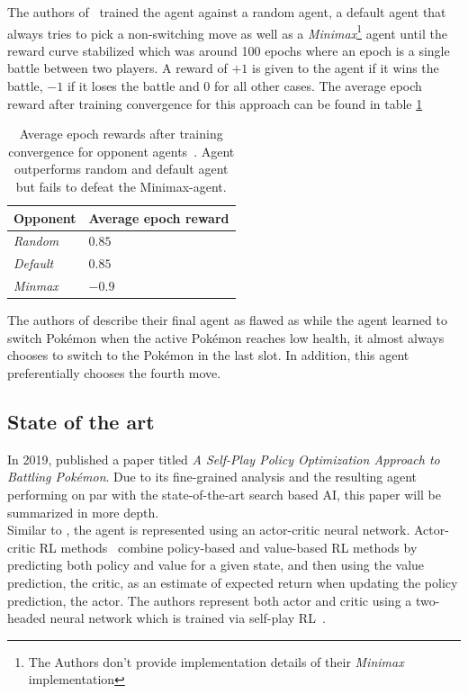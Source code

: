The authors of~\cite{GottaTrainEmAll} trained the agent against a random agent, a default agent 
that always tries to pick a non-switching move as well as a \emph{Minimax}\footnote{The Authors don't
provide implementation details of their \emph{Minimax} implementation} agent
until the reward curve stabilized which was around 100 epochs where an epoch is a single battle between
two players. A reward of $+1$ is given to the agent if it wins the battle, $-1$ if it loses the battle and
$0$ for all other cases. The average epoch reward after training convergence for this approach can
be found in table \ref{tbl:Gotta-Performance}
\begin{table}[h]
    \centering
        \begin{tabular}{|l|l|}
            \hline
            Opponent & Average epoch reward \\
            \hline
            \emph{Random} & $0.85$ \\
            \hline
            \emph{Default} & $0.85$ \\
            \hline
            \emph{Minmax} & $-0.9$ \\
            \hline
        \end{tabular}
        \caption{Average epoch rewards after training convergence for opponent agents~\autocite{GottaTrainEmAll}. Agent
        outperforms random and default agent but fails to defeat the Minimax-agent.}
        \label{tbl:Gotta-Performance}
\end{table}
The authors of \cite{GottaTrainEmAll} describe their final agent as flawed as while the agent learned 
to switch Pokémon when the active Pokémon reaches low health, it almost always chooses to switch to the
Pokémon in the last slot. In addition, this agent preferentially chooses the fourth move. 

\subsection{State of the art}
In 2019, \cite{Huang_Lee_2019} published a paper titled \emph{A Self-Play Policy 
Optimization Approach to Battling Pokémon}. 
Due to its fine-grained analysis and the resulting agent performing on par with the state-of-the-art search
based AI, this paper will be summarized in more depth. \\
Similar to \cite{OpenAI_dota}, the agent is represented using an actor-critic neural network.
Actor-critic RL methods~\autocite{Konda_Tsitsiklis}
combine policy-based and value-based RL methods by predicting both policy and value for a given 
state, and then using the value prediction, the \grqq critic\grqq, as an estimate of expected
return when updating the policy prediction, the \grqq actor\grqq. The authors represent both
actor and critic using a two-headed neural network which is trained via self-play RL~\autocite{Huang_Lee_2019}.

